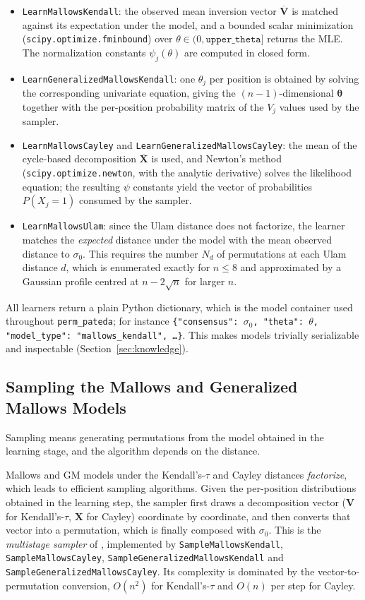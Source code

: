 \documentclass[a4paper,11pt]{article}
\begin{document}
\begin{itemize}
  \item \texttt{LearnMallowsKendall}: the observed mean inversion vector
    $\overline{\mathbf{V}}$ is matched against its expectation under the model,
    and a bounded scalar minimization (\texttt{scipy.optimize.fminbound}) over
    $\theta \in (0, \texttt{upper\_theta}]$ returns the MLE.  The
    normalization constants $\psi_j(\theta)$ are computed in closed form.
  \item \texttt{LearnGeneralizedMallowsKendall}: one $\theta_j$ per position is
    obtained by solving the corresponding univariate equation, giving the
    $(n-1)$-dimensional $\bm{\theta}$ together with the per-position probability
    matrix of the $V_j$ values used by the sampler.
  \item \texttt{LearnMallowsCayley} and
    \texttt{LearnGeneralizedMallowsCayley}: the mean of the cycle-based
    decomposition $\overline{\mathbf{X}}$ is used, and Newton's method
    (\texttt{scipy.optimize.newton}, with the analytic derivative) solves the
    likelihood equation; the resulting $\psi$ constants yield the vector of
    probabilities $P(X_j = 1)$ consumed by the sampler.
  \item \texttt{LearnMallowsUlam}: since the Ulam distance does not factorize,
    the learner matches the \emph{expected} distance under the model with the
    mean observed distance to $\sigma_0$.  This requires the number $N_d$ of
    permutations at each Ulam distance $d$, which is enumerated exactly for
    $n \leq 8$ and approximated by a Gaussian profile centred at
    $n - 2\sqrt{n}$ for larger $n$.
\end{itemize}

All learners return a plain Python dictionary, which is the model container used
throughout \texttt{perm\_pateda}; for instance
\texttt{\{"consensus": $\sigma_0$, "theta": $\theta$, "model\_type":
"mallows\_kendall", \ldots\}}.  This makes models trivially serializable and
inspectable (Section~\ref{sec:knowledge}).

\subsection{Sampling the Mallows and Generalized Mallows Models}

Sampling means generating permutations from the model obtained in the learning
stage, and the algorithm depends on the distance.

Mallows and GM models under the Kendall's-$\tau$ and Cayley distances
\emph{factorize}, which leads to efficient sampling algorithms.  Given the
per-position distributions obtained in the learning step, the sampler first draws
a decomposition vector ($\mathbf{V}$ for Kendall's-$\tau$, $\mathbf{X}$ for
Cayley) coordinate by coordinate, and then converts that vector into a
permutation, which is finally composed with $\sigma_0$.  This is the
\emph{multistage sampler} of \cite{Irurozki:2014}, implemented by
\texttt{SampleMallowsKendall}, \texttt{SampleMallowsCayley},
\texttt{SampleGeneralizedMallowsKendall} and
\texttt{SampleGeneralizedMallowsCayley}.  Its complexity is dominated by the
vector-to-permutation conversion, $O(n^2)$ for Kendall's-$\tau$ and $O(n)$ per
step for Cayley.
\end{document}
